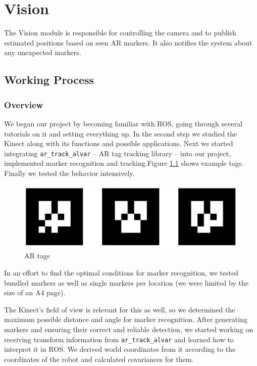 \chapter{Vision}
The Vision module is responsible for controlling the camera and to publish estimated positions based on seen AR markers. It also notifies the system about any unexpected markers.

\label{Vision chapter}
\section{Working Process}
\subsection{Overview}

We began our project by becoming familiar with ROS, going through  several tutorials on it and setting everything up. In the second step we studied the Kinect along with its functions and possible applications. Next we started integrating \texttt{ar\_track\_alvar} -- AR tag tracking library -- into our project, implemented marker recognition and tracking.Figure \ref{AR tags} shows example tags. Finally we tested the behavior intensively. \\
\begin{figure}
\begin{center}
\includegraphics[width=\linewidth]{graphics/markers.png}
\caption{AR tags}
\label{AR tags}
\end{center}
\end{figure}
In an effort to find the optimal conditions for marker recognition, we tested bundled markers as well as single markers per location (we were limited by the size of an A4 page).

The Kinect's field of view is relevant for this as well, so we determined the maximum possible distance and angle for marker recognition. After generating markers and ensuring their correct and reliable detection, we started working on receiving transform information from \texttt{ar\_track\_alvar} and learned how to interpret it in ROS. We derived world coordinates from it according to the coordinates of the robot and calculated covariances for them.

